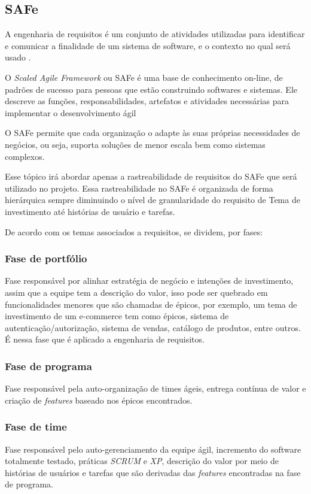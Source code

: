\subsection{SAFe}

A engenharia de requisitos é um conjunto de atividades utilizadas para identificar e comunicar a finalidade de um sistema de software, e o contexto no qual será usado \cite{leffingwell}.

O \textit{Scaled Agile Framework} ou SAFe é uma base de conhecimento on-line, de padrões de sucesso para pessoas que estão
construindo softwares e sistemas. Ele descreve as funções, responsabilidades, artefatos e atividades necessárias para
implementar o desenvolvimento ágil \cite{safe}

O SAFe permite que cada organização o adapte às suas próprias necessidades de negócios, ou seja, suporta soluções de menor escala bem como sistemas complexos.

Esse tópico irá abordar apenas a rastreabilidade de requisitos do SAFe que será utilizado no projeto. Essa
rastreabilidade no SAFe é organizada de forma hierárquica sempre diminuindo o nível de granularidade do requisito de
Tema de investimento até histórias de usuário e tarefas.

De acordo com \cite{safe} os temas associados a requisitos, se dividem, por fases:

\subsubsection{Fase de portfólio}

Fase responsável por alinhar estratégia de negócio e intenções de investimento, assim que a equipe tem a descrição do
valor, isso pode ser quebrado em funcionalidades menores que são chamadas de épicos, por exemplo, um tema de
investimento de um e-commerce tem como épicos, sistema de autenticação/autorização, sistema de vendas, catálogo de
produtos, entre outros. É nessa fase que é aplicado a engenharia de requisitos.

\subsubsection{Fase de programa}

Fase responsável pela auto-organização de times ágeis, entrega contínua de valor e criação de \textit{features} baseado nos épicos encontrados.

\subsubsection{Fase de time}

Fase responsável pelo auto-gerenciamento da equipe ágil, incremento do software totalmente testado, práticas \textit{SCRUM} e \textit{XP}, descrição do valor por meio de histórias de usuários e tarefas que são derivadas das \textit{features} encontradas na fase de programa.

